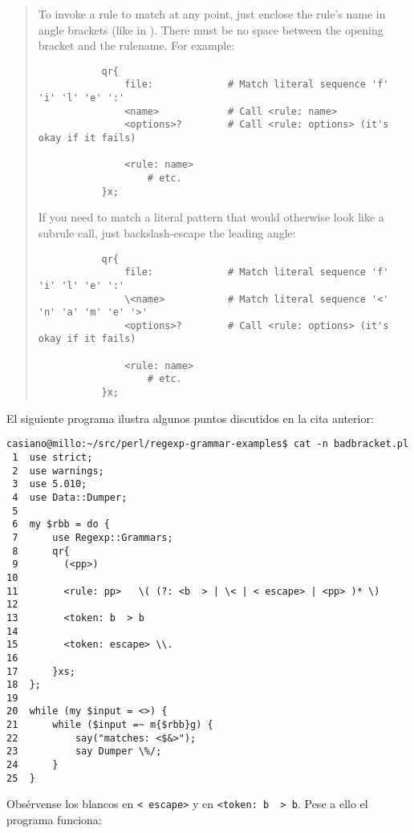 \begin{it}\begin{quotation}
To invoke a rule to match at any point, just enclose the rule’s name
in angle brackets (like in ). There must be no space between the
opening bracket and the rulename. For example:

\begin{verbatim}
           qr{
               file:             # Match literal sequence 'f' 'i' 'l' 'e' ':'
               <name>            # Call <rule: name>
               <options>?        # Call <rule: options> (it's okay if it fails)

               <rule: name>
                   # etc.
           }x;
\end{verbatim}

If you need to match a literal pattern that would otherwise look like a subrule call, just backslash-escape the leading angle:

\begin{verbatim}
           qr{
               file:             # Match literal sequence 'f' 'i' 'l' 'e' ':'
               \<name>           # Match literal sequence '<' 'n' 'a' 'm' 'e' '>'
               <options>?        # Call <rule: options> (it's okay if it fails)

               <rule: name>
                   # etc.
           }x;
\end{verbatim}
\end{quotation}\end{it}

El siguiente programa ilustra algunos puntos discutidos en la cita anterior:
\begin{verbatim}
casiano@millo:~/src/perl/regexp-grammar-examples$ cat -n badbracket.pl
 1  use strict;
 2  use warnings;
 3  use 5.010;
 4  use Data::Dumper;
 5
 6  my $rbb = do {
 7      use Regexp::Grammars;
 8      qr{
 9        (<pp>)
10
11        <rule: pp>   \( (?: <b  > | \< | < escape> | <pp> )* \)
12
13        <token: b  > b
14
15        <token: escape> \\.
16
17      }xs;
18  };
19
20  while (my $input = <>) {
21      while ($input =~ m{$rbb}g) {
22          say("matches: <$&>");
23          say Dumper \%/;
24      }
25  }
\end{verbatim}

Obsérvense los blancos en \verb|< escape>| y en \verb|<token: b  > b|.
Pese a ello el programa funciona:

